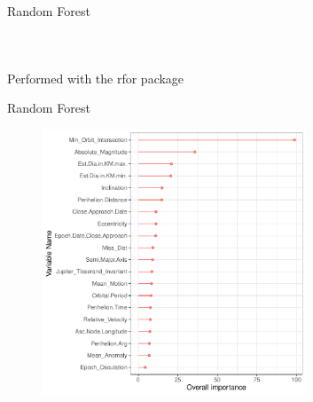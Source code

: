 \documentclass{beamer}
\begin{document}
\begin{frame}{Random Forest}
\begin{columns}
\begin{figure}[b]{\textwidth}
  \end{figure}
\end{columns}
\begin{center}
Performed with the rfor package \cite{rfor}
\end{center}
\end{frame}

\begin{frame}{Random Forest}
  \begin{figure}[b]{\textwidth}
    \includegraphics[width=0.7\textwidth]{Pic/RF_Importance.pdf}
  \end{figure} 
\end{frame}
\end{document}
